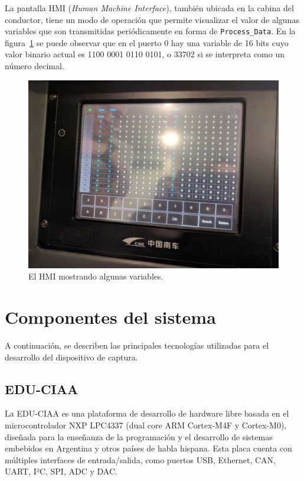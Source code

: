 La pantalla HMI (\textit{Human Machine Interface}), también ubicada en la cabina del conductor, tiene un modo de operación que permite visualizar el valor de algunas variables que son transmitidas periódicamente en forma de \texttt{Process\_Data}. En la figura~\ref{fig:hmi} se puede observar que en el puerto 0 hay una variable de 16 bits cuyo valor binario actual es 1100 0001 0110 0101, o 33702 si se interpreta como un número decimal.

\begin{figure}[htbp]
	\centering
	\includegraphics[width=1\textwidth]{./Figures/hmi.jpg}
	\caption[El HMI mostrando algunas variables]{El HMI mostrando algunas variables.}
    \label{fig:hmi}
\end{figure}

\section{Componentes del sistema}

A continuación, se describen las principales tecnologías utilizadas para el desarrollo del dispositivo de captura.

\subsection{EDU-CIAA}

La EDU-CIAA \cite{web:ciaa} es una plataforma de desarrollo de hardware libre basada en el microcontrolador NXP LPC4337 \cite{web:lpc4337} (dual core ARM Cortex-M4F y Cortex-M0), diseñada para la enseñanza de la programación y el desarrollo de sistemas embebidos en Argentina y otros países de habla hispana.
Esta placa cuenta con múltiples interfaces de entrada/salida, como puertos USB, Ethernet, CAN, UART, I²C, SPI, ADC y DAC.


